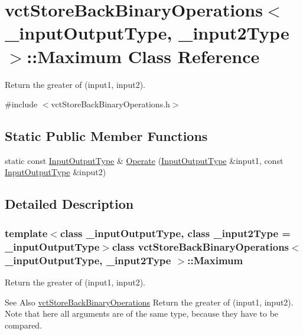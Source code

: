 \hypertarget{classvct_store_back_binary_operations_1_1_maximum}{\section{vct\-Store\-Back\-Binary\-Operations$<$ \-\_\-input\-Output\-Type, \-\_\-input2\-Type $>$\-:\-:Maximum Class Reference}
\label{classvct_store_back_binary_operations_1_1_maximum}
}


Return the greater of (input1, input2).  




{\ttfamily \#include $<$vct\-Store\-Back\-Binary\-Operations.\-h$>$}

\subsection*{Static Public Member Functions}
\begin{DoxyCompactItemize}
\item 
static const \hyperlink{classvct_store_back_binary_operations_a9dc481d9e1345541dd5d833d5e5688f3}{Input\-Output\-Type} \& \hyperlink{classvct_store_back_binary_operations_1_1_maximum_ace06682e360419756669eb9d021569bb}{Operate} (\hyperlink{classvct_store_back_binary_operations_a9dc481d9e1345541dd5d833d5e5688f3}{Input\-Output\-Type} \&input1, const \hyperlink{classvct_store_back_binary_operations_a9dc481d9e1345541dd5d833d5e5688f3}{Input\-Output\-Type} \&input2)
\end{DoxyCompactItemize}


\subsection{Detailed Description}
\subsubsection*{template$<$class \-\_\-input\-Output\-Type, class \-\_\-input2\-Type = \-\_\-input\-Output\-Type$>$class vct\-Store\-Back\-Binary\-Operations$<$ \-\_\-input\-Output\-Type, \-\_\-input2\-Type $>$\-::\-Maximum}

Return the greater of (input1, input2). 

\begin{DoxySeeAlso}{See Also}
\hyperlink{classvct_store_back_binary_operations}{vct\-Store\-Back\-Binary\-Operations} Return the greater of (input1, input2). Note that here all arguments are of the same type, because they have to be compared. 
\end{DoxySeeAlso}


